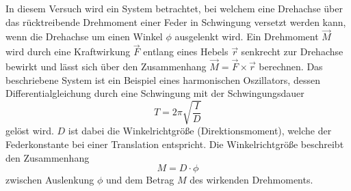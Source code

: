 In diesem Versuch wird ein System betrachtet, bei welchem eine Drehachse über das rücktreibende Drehmoment einer Feder in Schwingung versetzt werden kann, wenn die Drehachse
um einen Winkel $\phi$ ausgelenkt wird. Ein Drehmoment $\vec{M}$ wird durch eine Kraftwirkung $\vec{F}$ entlang eines Hebels $\vec{r}$ senkrecht zur Drehachse bewirkt und 
lässt sich über den Zusammenhang $\vec{M} = \vec{F} \times \vec{r}$ berechnen.
Das beschriebene System ist ein Beispiel eines harmonischen Oszillators, dessen Differentialgleichung durch eine Schwingung mit der Schwingungsdauer 
\begin{equation}
    \label{eqn:Schwingungsdauer}
    T = 2\pi \sqrt{\frac{I}{D}}
\end{equation}
gelöst wird. $D$ ist dabei die Winkelrichtgröße (Direktionsmoment), welche der Federkonstante bei einer Translation entspricht. Die Winkelrichtgröße beschreibt den Zusammenhang 
\begin{equation}
    \label{eqn:Winkelrichtgröße}
    M = D \cdot \phi
\end{equation}
zwischen Auslenkung $\phi$ und dem Betrag $M$ des wirkenden Drehmoments.
